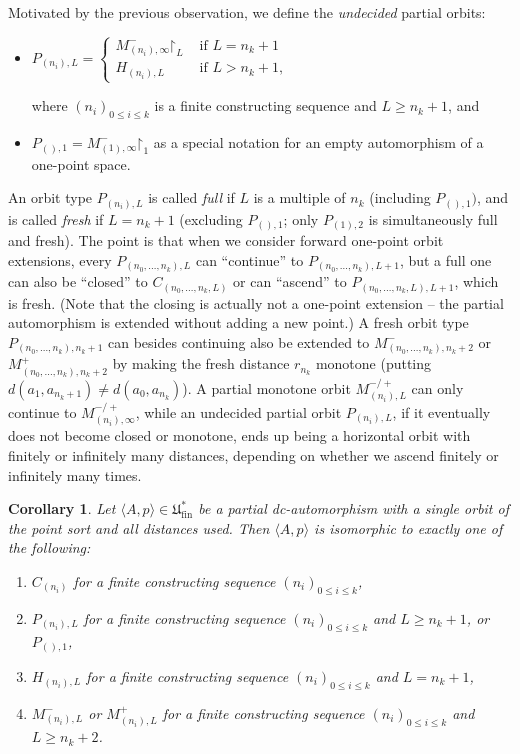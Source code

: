\documentclass[oneside,notitlepage,12pt]{article}
\newtheorem{wn}[tw]{Corollary}
\theoremstyle{definition}
\theoremstyle{remark}
\newcommand \seq [1]{\langle #1 \rangle}
\newcommand \restr [1] {\mathord{\upharpoonright}_{#1}}
\newcommand \fin {{\operatorname{fin}}}
\newcommand \Ult {\mathfrak{U}}
\begin{document}
Motivated by the previous observation, we define the \emph{undecided} partial orbits:
\begin{itemize}
    \item 
    $P_{(n_i), L}=
    \begin{cases}
    M^-_{(n_i), \infty}\restr{L} & \text{ if } L = n_k + 1 \\  H_{(n_i), L} & \text{ if } L > n_k + 1,
    \end{cases}$
    
    where $(n_i)_{0 \leq i \leq k}$
    is a finite constructing sequence and $L \geq n_k + 1$, and

    \item $P_{(), 1} = M^-_{(1), \infty}\restr{1}$ as a special notation for an empty automorphism of a one-point space.
\end{itemize}
An orbit type $P_{(n_i), L}$ is called \emph{full} if $L$ is a multiple of $n_k$ (including $P_{(), 1})$, and is called \emph{fresh} if $L = n_k + 1$ (excluding $P_{(), 1}$; only $P_{(1), 2}$ is simultaneously full and fresh).
The point is that when we consider forward one-point orbit extensions, every $P_{(n_0, \ldots, n_k), L}$ can ``continue'' to $P_{(n_0, \ldots, n_k), L + 1}$, but a full one can also be ``closed'' to $C_{(n_0, \ldots, n_k, L)}$ or can ``ascend'' to $P_{(n_0, \ldots, n_k, L), L + 1}$,  which is fresh.
(Note that the closing is actually not a one-point extension – the partial automorphism is extended without adding a new point.)
A fresh orbit type $P_{(n_0, \ldots, n_k), n_k + 1}$ can besides continuing also be extended to $M^-_{(n_0, \ldots, n_k), n_k + 2}$ or $M^+_{(n_0, \ldots, n_k), n_k + 2}$ by making the fresh distance $r_{n_k}$ monotone (putting $d(a_1, a_{n_k + 1}) \neq d(a_0, a_{n_k})$). 
A partial monotone orbit $M^{-/+}_{(n_i), L}$ can only continue  to $M^{-/+}_{(n_i), \infty}$, while an undecided partial orbit $P_{(n_i), L}$, if it eventually does not become closed or monotone, ends up being a horizontal orbit with finitely or infinitely many distances, depending on whether we ascend finitely or infinitely many times.


\begin{wn} \label{thm:partial_single_orbit}
    Let $\seq{A, p} \in \Ult^*_\fin$ be a partial dc-automorphism with a single orbit of the point sort and all distances used.
    Then $\seq{A, p}$ is isomorphic to exactly one of the following:
    \begin{enumerate}
        \item $C_{(n_i)}$ for a finite constructing sequence $(n_i)_{0 \leq i \leq k}$,
        \item $P_{(n_i), L}$ for a finite constructing sequence $(n_i)_{0 \leq i \leq k}$ and $L \geq n_k + 1$, or $P_{(), 1}$,
        \item $H_{(n_i), L}$ for a finite constructing sequence $(n_i)_{0 \leq i \leq k}$ and $L = n_k + 1$,
        \item $M^-_{(n_i), L}$ or $M^+_{(n_i), L}$ for a finite constructing sequence $(n_i)_{0 \leq i \leq k}$ and $L \geq n_k + 2$.
    \end{enumerate}
\end{wn}
\end{document}
